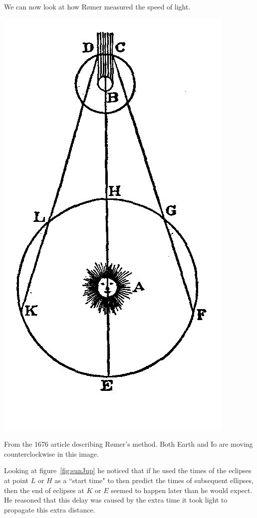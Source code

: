 \documentclass{tufte-handout}
\begin{document}
We can now look at how R{\o}mer measured the speed of light.
\begin{marginfigure}
\includegraphics{Roemer.jpg}
\caption{From the 1676 article describing R{\o}mer's method. Both Earth and Io are moving counterclockwise in this image.}
\label{fig:sunJup}
\end{marginfigure}
Looking at figure~\ref{fig:sunJup} he noticed that if he used the times of the eclipses at point $L$ or $H$ as a ``start time" to then predict the times of subsequent ellipses, then the end of eclipses at $K$ or $E$ seemed to happen later than he would expect. He reasoned that this delay was caused by the extra time it took light to propagate this extra distance. 
\end{document}
